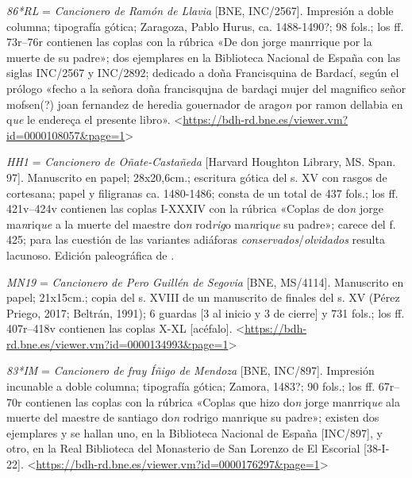 \documentclass[11pt,a4paper,twoside]{article}
\newcommand{\comillas}[1]{«#1»}
\begin{document}
\emph{86*RL} = \emph{Cancionero de Ramón de Llavia} [BNE, INC/2567].
%
Impresión a doble columna; tipografía gótica; Zaragoza, Pablo Hurus, ca. 1488-1490?; 98 fols.; los ff. 73r--76r contienen las coplas con la rúbrica \comillas{De don jorge manrrique por la muerte de su padre}; dos ejemplares en la Biblioteca Nacional de España con las siglas INC/2567 y INC/2892; dedicado a doña Francisquina de Bardací, según el prólogo \comillas{fecho a la señora doña francisqujna de bardaçi mujer del magnifico señor mofsen(?) joan fernandez de heredia gouernador de arago\emph{n} por ramon dellabia en q\emph{ue} le endereça el presente libro}. <\url{https://bdh-rd.bne.es/viewer.vm?id=0000108057&page=1}>\par

\emph{HH1} = \emph{Cancionero de Oñate-Castañeda} [Harvard Houghton Library, MS. Span. 97].
%
Manuscrito en papel; 28x20,6cm.; escritura gótica del s. XV con rasgos de cortesana; papel y filigranas ca. 1480-1486; consta de un total de 437 fols.; los ff. 421v--424v contienen las coplas I-XXXIV con la rúbrica \comillas{Coplas de do\emph{n} jorge ma\emph{n}riq\emph{ue} a la muerte del maestre do\emph{n} rod\emph{rig}o ma\emph{n}riq\emph{ue} su padre}; carece del f. 425; para las cuestión de las variantes adiáforas \emph{conservados}/\emph{olvidados} resulta lacunoso. Edición paleográfica de \textcite{Severin1990}.\par

\emph{MN19} = \emph{Cancionero de Pero Guillén de Segovia} [BNE, MS/4114].
%
Manuscrito en papel; 21x15cm.; copia del s. XVIII de un manuscrito de finales del s. XV (Pérez Priego, 2017; Beltrán, 1991); 6 guardas [3 al inicio y 3 de cierre] y 731 fols.; los ff. 407r--418v contienen las coplas X-XL [acéfalo]. <\url{https://bdh-rd.bne.es/viewer.vm?id=0000134993&page=1}>\par

\emph{83*IM} = \emph{Cancionero de fray Íñigo de Mendoza} [BNE, INC/897].
%
Impresión incunable a doble columna; tipografía gótica; Zamora, 1483?; 90 fols.; los ff. 67r--70r contienen las coplas con la rúbrica \comillas{Coplas que hizo do\emph{n} jorge manrriq\emph{ue} ala muerte del maestre de santiago do\emph{n} rodrigo manrique su padre}; existen dos ejemplares y se hallan uno, en la Biblioteca Nacional de España [INC/897], y otro, en la Real Biblioteca del Monasterio de San Lorenzo de El Escorial [38-I-22]. <\url{https://bdh-rd.bne.es/viewer.vm?id=0000176297&page=1}>\par
\relax
\vfill
\end{document}

